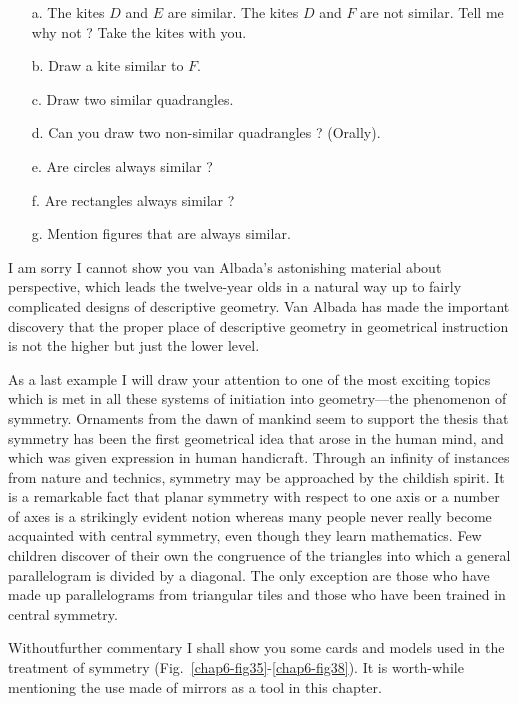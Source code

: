 \begin{itemize}
\itemsep=2pt
\item[a.] The kites $D$ and $E$ are similar. The kites $D$ and $F$ are not similar. Tell me why not ? Take the kites with you.

\item[b.] Draw a kite similar to $F$.

\item[c.] Draw two similar quadrangles.

\item[d.] Can you draw two non-similar quadrangles ? (Orally).

\item[e.] Are circles always similar ?

\item[f.] Are rectangles always similar ?

\item[g.] Mention figures that are always similar.
\end{itemize}

I am sorry I cannot show you van Albada's astonishing material about perspective, which leads the twelve-year olds in a natural way up to fairly complicated designs of descriptive geometry. Van Albada has made the important discovery that the proper place of descriptive geometry in geometrical instruction is not the higher but just the lower level.

As a last example I will draw your attention to one of the most exciting topics which is met in all these systems of initiation into geometry---the phenomenon of symmetry. Ornaments from the dawn of mankind seem to support the thesis that symmetry has been the first geometrical idea that arose in the human mind, and which was given expression in human handicraft. Through an infinity of instances from nature and technics, symmetry may be approached by the childish spirit. It is a remarkable fact that planar symmetry with respect to one axis or a number of axes is a strikingly evident notion whereas many people never really become acquainted with central symmetry, even though they learn mathematics. Few children discover of their own the congruence of the triangles into which a general parallelogram is divided by a diagonal. The only exception are those who have made up parallelograms from triangular tiles and those who have been trained in central symmetry.

Without\pageoriginale further commentary I shall show you some cards and models used in the treatment of symmetry (Fig.~\ref{chap6-fig35}-\ref{chap6-fig38}). It is worth-while mentioning the use made of mirrors as a tool in this chapter.

